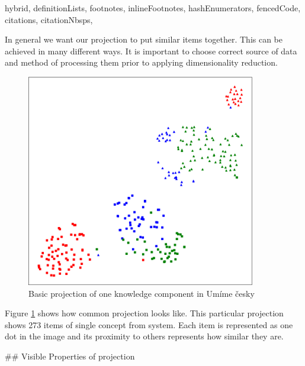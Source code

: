 \documentclass[
  digital, %
  table,   %
  nolof,     %
  nolot,     %
  nocover
]{fithesis3}
\begin{document}
\begin{markdown*}{%
  hybrid,
  definitionLists,
  footnotes,
  inlineFootnotes,
  hashEnumerators,
  fencedCode,
  citations,
  citationNbsps,
}

In general we want our projection to put similar items together. This can be achieved in many different ways. It is important to choose correct source of data and method of processing them prior to applying dimensionality reduction.


\begin{figure}
  \begin{center}
    \includegraphics[width=10cm]{img/common_projection}
  \end{center}
  \caption{Basic projection of one knowledge component in Umíme česky}
  \label{fig:commonprojection}
\end{figure}

Figure \ref{fig:commonprojection} shows how common projection looks like. This particular projection shows 273 items of single concept from system. Each item is represented as one dot in the image and its proximity to others represents how similar they are.

## Visible Properties of projection



\end{markdown*}
\end{document}
